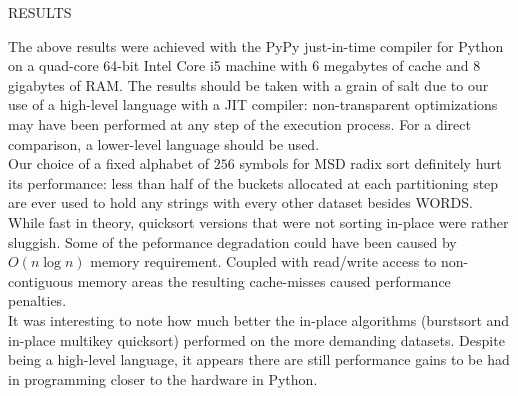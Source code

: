  {\sffamily\normalsize{\color{sciorange}RESULTS}}\vspace{-7mm}\small\\
 \footnotesize 
\begin{multicols}{3}
The above results were achieved with the PyPy just-in-time compiler for
Python on a quad-core 64-bit Intel Core i5 machine with 6 megabytes of
cache and 8 gigabytes of RAM.  The results should be taken with a grain
of salt due to our use of a high-level language with a JIT compiler:
non-transparent optimizations may have been performed at any step of the
execution process.  For a direct comparison, a lower-level language should
be used.\\

Our choice of a fixed alphabet of $256$ symbols for MSD radix sort definitely
hurt its performance: less than half of the buckets allocated at each
partitioning step are ever used to hold any strings with every other dataset
besides WORDS.\\

While fast in theory, quicksort versions that were not sorting in-place were
rather sluggish.  Some of the peformance degradation could have been caused
by $O(n \log n)$  memory requirement.  Coupled with read/write access to
non-contiguous memory areas the resulting cache-misses caused performance
penalties.\\

It was interesting to note how much better the in-place algorithms (burstsort
and in-place multikey quicksort) performed on the more demanding datasets.
Despite being a high-level language, it appears there are still performance
gains to be had in programming closer to the hardware in Python.
\end{multicols}
